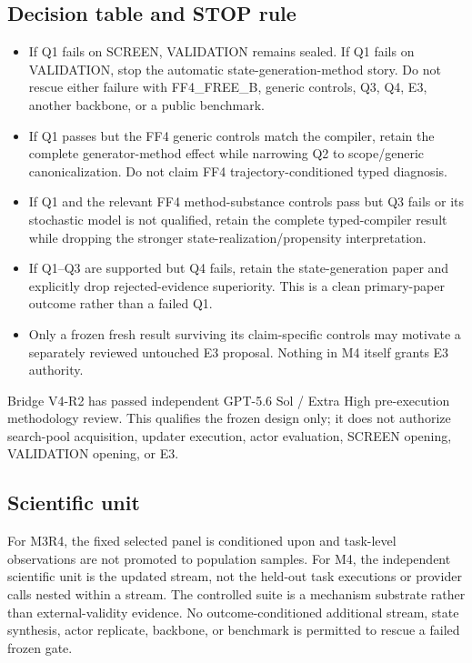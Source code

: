 \subsection{Decision table and STOP rule}
\begin{itemize}
    \item If Q1 fails on SCREEN, VALIDATION remains sealed. If Q1 fails on VALIDATION, stop the automatic state-generation-method story. Do not rescue either failure with FF4\_FREE\_B, generic controls, Q3, Q4, E3, another backbone, or a public benchmark.
    \item If Q1 passes but the FF4 generic controls match the compiler, retain the complete generator-method effect while narrowing Q2 to scope/generic canonicalization. Do not claim FF4 trajectory-conditioned typed diagnosis.
    \item If Q1 and the relevant FF4 method-substance controls pass but Q3 fails or its stochastic model is not qualified, retain the complete typed-compiler result while dropping the stronger state-realization/propensity interpretation.
    \item If Q1--Q3 are supported but Q4 fails, retain the state-generation paper and explicitly drop rejected-evidence superiority. This is a clean primary-paper outcome rather than a failed Q1.
    \item Only a frozen fresh result surviving its claim-specific controls may motivate a separately reviewed untouched E3 proposal. Nothing in M4 itself grants E3 authority.
\end{itemize}

Bridge V4-R2 has passed independent GPT-5.6 Sol / Extra High pre-execution methodology review. This qualifies the frozen design only; it does not authorize search-pool acquisition, updater execution, actor evaluation, SCREEN opening, VALIDATION opening, or E3.

\subsection{Scientific unit}
For M3R4, the fixed selected panel is conditioned upon and task-level observations are not promoted to population samples. For M4, the independent scientific unit is the updated stream, not the held-out task executions or provider calls nested within a stream. The controlled suite is a mechanism substrate rather than external-validity evidence. No outcome-conditioned additional stream, state synthesis, actor replicate, backbone, or benchmark is permitted to rescue a failed frozen gate.
